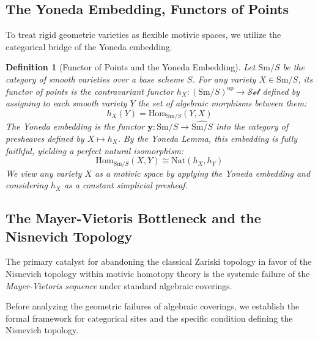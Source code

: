 \documentclass[11pt,oneside]{article}
\newtheorem{definition}{Definition}[section]
\begin{document}
\subsection{The Yoneda Embedding, Functors of Points}
To treat rigid geometric varieties as flexible motivic spaces, we utilize the categorical bridge of the Yoneda embedding.

\begin{definition}[Functor of Points and the Yoneda Embedding]
Let $\text{Sm}/S$ be the category of smooth varieties over a base scheme $S$. For any variety $X \in \text{Sm}/S$, its \emph{functor of points} is the contravariant functor $h_X: (\text{Sm}/S)^{\text{op}} \to \mathcal{Set}$ defined by assigning to each smooth variety $Y$ the set of algebraic morphisms between them:
\[ h_X(Y) = \text{Hom}_{\text{Sm}/S}(Y, X) \]
The \emph{Yoneda embedding} is the functor $\mathbf{y}: \text{Sm}/S \to \widehat{\text{Sm}/S}$ into the category of presheaves defined by $X \mapsto h_X$. By the Yoneda Lemma, this embedding is fully faithful, yielding a perfect natural isomorphism:
\[ \text{Hom}_{\text{Sm}/S}(X, Y) \cong \text{Nat}(h_X, h_Y) \]
We view any variety $X$ as a motivic space by applying the Yoneda embedding and considering $h_X$ as a constant simplicial presheaf.
\end{definition}

\subsection{The Mayer-Vietoris Bottleneck and the Nisnevich Topology}
The primary catalyst for abandoning the classical Zariski topology in favor of the Nisnevich topology within motivic homotopy theory is the systemic failure of the \emph{Mayer-Vietoris sequence} under standard algebraic coverings. 


Before analyzing the geometric failures of algebraic coverings, we establish the formal framework for categorical sites and the specific condition defining the Nisnevich topology.
\end{document}
